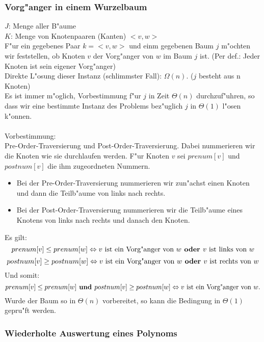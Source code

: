\documentclass[a4paper,twoside,DIV15,BCOR12mm]{scrbook}
\begin{document}
\subsubsection*{Vorg"anger in einem Wurzelbaum}	

$J$: Menge aller B"aume\\
$K$: Menge von Knotenpaaren (Kanten) $<v,w>$\\

F"ur ein gegebenes Paar $k=<v,w>$ und einm gegebenen Baum $j$ m"ochten wir feststellen, ob Knoten $v$ der Vorg"anger von $w$ im Baum $j$ ist. (Per def.: Jeder Knoten ist sein eigener Vorg"anger)\\
Direkte L"osung dieser Instanz (schlimmster Fall): $\Omega(n)$. ($j$ besteht aus n Knoten)\\ 

Es ist immer m"oglich, Vorbestimmung f"ur $j$ in Zeit $\Theta(n)$ durchzuf"uhren, so dass wir eine bestimmte Instanz des Problems bez"uglich $j$ in $\Theta(1)$ l"osen k"onnen.\\

\\

Vorbestimmung: \\
 Pre-Order-Traversierung und Post-Order-Traversierung. Dabei nummerieren wir die Knoten wie sie durchlaufen werden. F"ur Knoten $v$ sei $prenum[v]$ und $postnum[v]$ die ihm zugeordneten Nummern. 
\begin{itemize}
	\item Bei der Pre-Order-Traversierung nummerieren wir zun"achst einen Knoten und dann die Teilb"aume von links nach rechts. 
	\item Bei der Post-Order-Traversierung nummerieren wir die Teilb"aume eines Knotens von links nach rechts und danach den Knoten.
\end{itemize}
 Es gilt: 
 $$prenum[v]\le prenum[w] \Leftrightarrow v \text{ ist ein Vorg"anger von } w \textbf{ oder } v \text{ ist links von } w$$
 $$postnum[v]\ge postnum[w] \Leftrightarrow v \text{ ist ein Vorg"anger von } w \textbf{ oder } v \text{ ist rechts von } w$$
 Und somit:
 $$prenum[v]\le prenum[w] \textbf{ und } postnum[v]\ge postnum[w] \Leftrightarrow v \text{ ist ein Vorg"anger von } w.$$
 Wurde der Baum so in $\Theta(n)$ vorbereitet, so kann die Bedingung in $\Theta(1)$ gepru"ft  werden.
 
\subsubsection*{Wiederholte Auswertung eines Polynoms}
\end{document}
